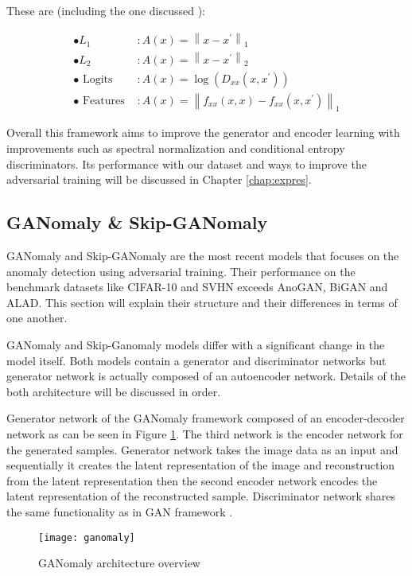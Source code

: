 These are (including the one discussed ):

\begin{equation}
\begin{aligned} \bullet L_{1} & : A(x)=\left\|x-x^{\prime}\right\|_{1} \\ \bullet L_{2} & : A(x)=\left\|x-x^{\prime}\right\|_{2} \\ \bullet \text { Logits } & : A(x)=\log \left(D_{x x}\left(x, x^{\prime}\right)\right) \\ \bullet \text { Features } & : A(x)=\left\|f_{x x}(x, x)-f_{x x}\left(x, x^{\prime}\right)\right\|_{1} \end{aligned}
\end{equation}

Overall this framework aims to improve the generator and encoder learning with improvements such as spectral
normalization and conditional entropy discriminators. Its performance with our dataset and ways to
improve the adversarial training will be discussed in Chapter \ref{chap:expres}.

\subsection{GANomaly \& Skip-GANomaly}

\label{sec:ganomaly}

GANomaly \cite{Akay2018GANomalySA} and Skip-GANomaly \cite{Akay2019SkipGANomalySC} are the
most recent models that focuses on the anomaly detection using adversarial training. 
Their performance on the benchmark datasets like CIFAR-10
\cite{cifar10} and SVHN \cite{Netzer2011ReadingDI} exceeds AnoGAN, BiGAN and ALAD. This
section will explain their structure and their differences in terms of one another.

GANomaly and Skip-Ganomaly models differ with a significant change in the model itself. Both 
models contain a generator and discriminator networks but generator network is actually composed of an
autoencoder network. Details of the both architecture will be discussed in order.

Generator network of the GANomaly framework composed of an encoder-decoder network as can be seen in
Figure \ref{fig:ganomaly_model}. The third network is the encoder network for the generated samples.
Generator network takes the image data as an input and sequentially it creates the latent
representation of the image and reconstruction from the latent representation then the second
encoder network encodes the latent representation of the reconstructed sample. Discriminator network
shares the same functionality as in GAN framework \cite{Goodfellow:2014:GAN:2969033.2969125}.
\begin{figure}[h!]
	\centering
	\texttt{[image: ganomaly]}
    \caption{GANomaly architecture overview}
    \label{fig:ganomaly_model}
\end{figure}

